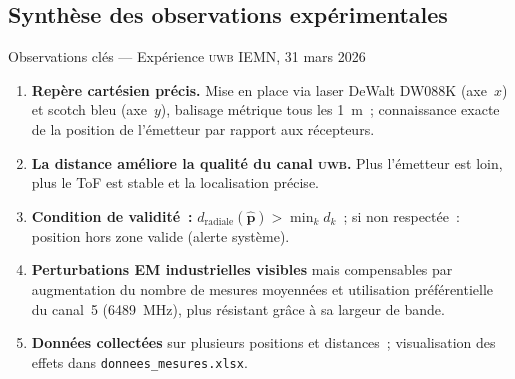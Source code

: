 \documentclass[12pt, a4paper]{article}
\newcommand{\UWB}{\textsc{uwb}}
\begin{document}
\subsection{Synthèse des observations expérimentales}

\begin{summarybox}{Observations clés — Expérience \UWB{} IEMN, 31 mars 2026}
\begin{enumerate}[label=\textbf{\arabic*.}, itemsep=4pt]
  \item \textbf{Repère cartésien précis.} Mise en place via laser DeWalt DW088K
        (axe~$x$) et scotch bleu (axe~$y$), balisage métrique tous les 1~m~;
        connaissance exacte de la position de l'émetteur par rapport aux récepteurs.

  \item \textbf{La distance améliore la qualité du canal \UWB{}.}
        Plus l'émetteur est loin, plus le ToF est stable et la localisation précise.

  \item \textbf{Condition de validité~:}
        $d_{\text{radiale}}(\hat{\mathbf{p}}) > \min_k d_k$~;
        si non respectée~: position hors zone valide (alerte système).

  \item \textbf{Perturbations EM industrielles visibles} mais compensables par
        augmentation du nombre de mesures moyennées et utilisation préférentielle
        du canal~5 (6489~MHz), plus résistant grâce à sa largeur de bande.

  \item \textbf{Données collectées} sur plusieurs positions et distances~;
        visualisation des effets dans \texttt{donnees\_mesures.xlsx}.
\end{enumerate}
\end{summarybox}
\end{document}
